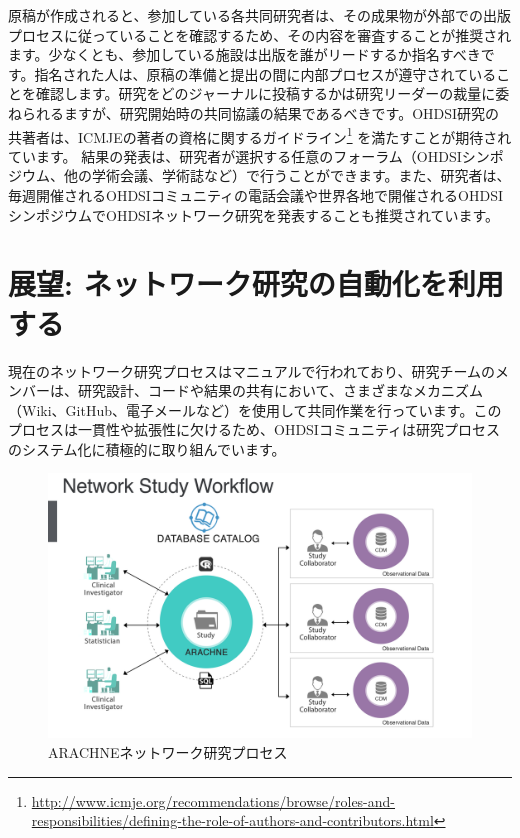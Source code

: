 \documentclass[
  11pt]{book}
\theoremstyle{definition}
\theoremstyle{definition}
\theoremstyle{definition}
\theoremstyle{definition}
\theoremstyle{remark}
\begin{document}
原稿が作成されると、参加している各共同研究者は、その成果物が外部での出版プロセスに従っていることを確認するため、その内容を審査することが推奨されます。少なくとも、参加している施設は出版を誰がリードするか指名すべきです。指名された人は、原稿の準備と提出の間に内部プロセスが遵守されていることを確認します。研究をどのジャーナルに投稿するかは研究リーダーの裁量に委ねられるますが、研究開始時の共同協議の結果であるべきです。OHDSI研究の共著者は、ICMJEの著者の資格に関するガイドライン\footnote{\url{http://www.icmje.org/recommendations/browse/roles-and-responsibilities/defining-the-role-of-authors-and-contributors.html}} を満たすことが期待されています。 結果の発表は、研究者が選択する任意のフォーラム（OHDSIシンポジウム、他の学術会議、学術誌など）で行うことができます。また、研究者は、毎週開催されるOHDSIコミュニティの電話会議や世界各地で開催されるOHDSIシンポジウムでOHDSIネットワーク研究を発表することも推奨されています。

\section{展望: ネットワーク研究の自動化を利用する}\label{ux5c55ux671b-ux30cdux30c3ux30c8ux30efux30fcux30afux7814ux7a76ux306eux81eaux52d5ux5316ux3092ux5229ux7528ux3059ux308b}


現在のネットワーク研究プロセスはマニュアルで行われており、研究チームのメンバーは、研究設計、コードや結果の共有において、さまざまなメカニズム（Wiki、GitHub、電子メールなど）を使用して共同作業を行っています。このプロセスは一貫性や拡張性に欠けるため、OHDSIコミュニティは研究プロセスのシステム化に積極的に取り組んでいます。

\begin{figure}[h]

{\centering \includegraphics[width=0.9\linewidth]{images/NetworkStudies/ARACHNE} 

}

\caption{ARACHNEネットワーク研究プロセス}\label{fig:arachne}
\end{figure}
\end{document}

